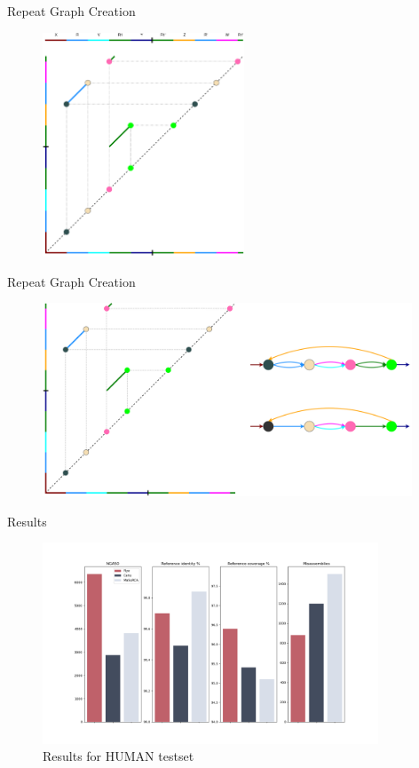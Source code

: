 \documentclass{beamer}
\begin{document}
  \begin{frame}{Repeat Graph Creation}
    \begin{figure}
      \captionsetup{labelformat=empty}
      \includegraphics[width=6cm]{images/dot_plot.png}
      \label{fig:bp_graph}
    \end{figure}
  \end{frame}

  \begin{frame}{Repeat Graph Creation}
    \begin{figure}
      \captionsetup{labelformat=empty}
      \includegraphics[width=11cm]{images/plot_to_repeat_graph.png}
      \label{fig:repeat_graph}
    \end{figure}
  \end{frame}

  \begin{frame}{Results}
    \begin{figure}
      \includegraphics[width=10cm]{images/results_HUMAN.png}
      \caption{Results for HUMAN testset}
      \label{fig:results}
    \end{figure}
  \end{frame}
\end{document}

